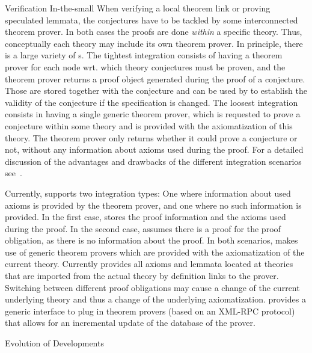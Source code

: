 \begin{omgroup}[id=maya,short=\maya,creators={autexier,hutter,mossakowski,shairer}]
\begin{omgroup}{Verification In-the-small}
When verifying a local theorem link or proving speculated lemmata, the conjectures have to
be tackled by some interconnected theorem prover.  In both cases the proofs are done
{\emph{within}} a specific theory.  Thus, conceptually each theory may include its own
theorem prover.  In principle, there is a large variety of
{s}. The tightest integration consists of having a theorem
prover for each node wrt.  which theory conjectures must be proven, and the theorem prover
returns a proof object generated during the proof of a conjecture.  Those are stored
together with the conjecture and can be used by {\maya} to establish the validity of the
conjecture if the specification is changed. The loosest integration consists in having a
single generic theorem prover, which is requested to prove a conjecture within some theory
and is provided with the axiomatization of this theory. The theorem prover only returns
whether it could prove a conjecture or not, without any information about axioms used
during the proof. For a detailed discussion of the advantages and drawbacks of the
different integration scenarios see~\cite{AutMos:ihdgmm02}.

Currently, {\maya} supports two integration types: One where
information about used axioms is provided by the theorem prover, and
one where no such information is provided. In the first case, {\maya}
stores the proof information and the axioms used during the proof. In the second
case, {\maya} assumes there is a proof for the proof obligation, as there is no
information about the proof. In both scenarios, {\maya} makes use of
generic theorem provers which are provided with the axiomatization of
the current theory. Currently {\maya} provides all axioms
and lemmata located at theories that are imported from the actual theory
by definition links to the prover. Switching between different proof obligations may
cause a change of the current underlying theory and thus a change of
the underlying axiomatization.  {\maya} provides a generic interface to
plug in theorem provers (based on an XML-RPC protocol) that allows for
an incremental update of the database of the prover.
\end{omgroup}

\begin{omgroup}{Evolution of Developments}


\end{omgroup}
\end{omgroup}
